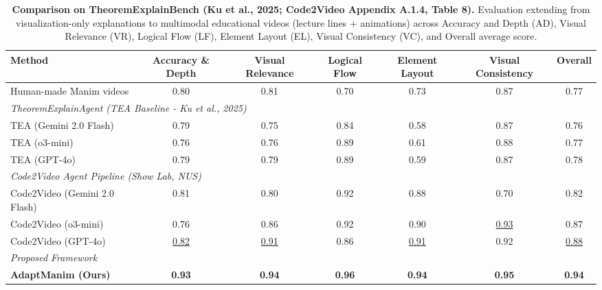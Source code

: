 \begin{table}[t]
\centering
\small
\caption{\textbf{Comparison on TheoremExplainBench (Ku et al., 2025; Code2Video Appendix A.1.4, Table 8).} 
Evaluation extending from visualization-only explanations to multimodal educational videos (lecture lines + animations) across Accuracy and Depth (AD), Visual Relevance (VR), Logical Flow (LF), Element Layout (EL), Visual Consistency (VC), and Overall average score.}
\label{tab:theorem_explain_bench}
\begin{tabular}{lcccccc}
\toprule
\textbf{Method} & \textbf{Accuracy \& Depth} & \textbf{Visual Relevance} & \textbf{Logical Flow} & \textbf{Element Layout} & \textbf{Visual Consistency} & \textbf{Overall} \\
\midrule
Human-made Manim videos & 0.80 & 0.81 & 0.70 & 0.73 & 0.87 & 0.77 \\
\midrule
\multicolumn{7}{l}{\textit{TheoremExplainAgent (TEA Baseline - Ku et al., 2025)}} \\
TEA (Gemini 2.0 Flash) & 0.79 & 0.75 & 0.84 & 0.58 & 0.87 & 0.76 \\
TEA (o3-mini) & 0.76 & 0.76 & 0.89 & 0.61 & 0.88 & 0.77 \\
TEA (GPT-4o) & 0.79 & 0.79 & 0.89 & 0.59 & 0.87 & 0.78 \\
\midrule
\multicolumn{7}{l}{\textit{Code2Video Agent Pipeline (Show Lab, NUS)}} \\
Code2Video (Gemini 2.0 Flash) & 0.81 & 0.80 & 0.92 & 0.88 & 0.70 & 0.82 \\
Code2Video (o3-mini) & 0.76 & 0.86 & 0.92 & 0.90 & \underline{0.93} & 0.87 \\
Code2Video (GPT-4o) & \underline{0.82} & \underline{0.91} & 0.86 & \underline{0.91} & 0.92 & \underline{0.88} \\
\midrule
\multicolumn{7}{l}{\textit{Proposed Framework}} \\
\textbf{AdaptManim (Ours)} & \textbf{0.93} & \textbf{0.94} & \textbf{0.96} & \textbf{0.94} & \textbf{0.95} & \textbf{0.94} \\
\bottomrule
\end{tabular}
\end{table}